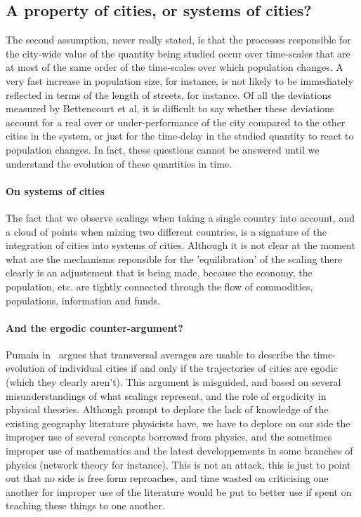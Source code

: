 \subsection{A property of cities, or systems of cities?}
\label{sub:a_property_of_cities_or_systems_of_cities_}



The second assumption, never really stated, is that the
processes responsible for the city-wide value of the quantity being studied
occur over time-scales that are at most of the same order of the time-scales
over which population changes. A very fast increase in population size, for
instance, is not likely to be immediately reflected in terms of the length of
streets, for instance. Of all the deviations measured by Bettencourt et al, it
is difficult to say whether these deviations account for a real over or
under-performance of the city compared to the other cities in the system, or
just for the time-delay in the studied quantity to react to population
changes. In fact, these questions cannot be answered until we understand the
evolution of these quantities in time.

\paragraph{On systems of cities} The fact that we observe scalings when taking a
single country into account, and a cloud of points when mixing two different
countries, is a signature of the integration of cities into systems of
cities. Although it is not clear at the moment what are the mechanisms
reponsible for the 'equilibration' of the scaling there clearly is an
adjustement that is being made, because the economy, the population, etc. are
tightly connected through the flow of commodities, populations, information and
funds.

\paragraph{And the ergodic counter-argument?} Pumain in~\cite{Pumain:2012} argues that
transversal averages are usable to describe the time-evolution of individual
cities if and only if the trajectories of cities are egodic (which they clearly
aren't). This argument is misguided, and based on several misunderstandings of
what scalings represent, and the role of ergodicity in physical theories.
Although prompt to deplore the lack of knowledge of the existing geography
literature physicists have, we have to deplore on our side the improper use of
several concepts borrowed from physics, and the sometimes improper use of
mathematics and the latest developpements in some branches of physics (network
theory for instance). This is not an attack, this is just to point out that no
side is free form reproaches, and time wasted on criticising one another for
improper use of the literature would be put to better use if spent on teaching
these things to one another.


